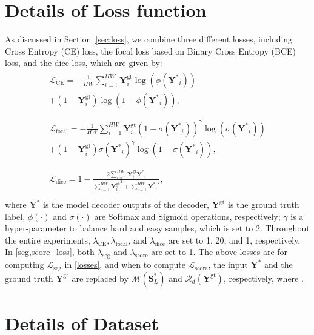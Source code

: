 \documentclass[nohyperref]{article}
\newcommand{\bs}{\boldsymbol}
\newcommand{\asty}{{\mathbf{Y}^*}}
\newcommand{\gty}{\mbf{Y}^{\text{gt}}}
\newcommand{\mbf}{\mathbf}
\theoremstyle{plain}
\theoremstyle{definition}
\theoremstyle{remark}
\begin{document}
\section{Details of Loss function}
\label{appendix:loss}
As discussed in Section~\ref{sec:loss}, we combine three different losses, including Cross Entropy (CE) loss, the focal loss based on Binary Cross Entropy (BCE) loss, and the dice loss, which are given  by:
\begin{align}
\begin{split}
\mathcal{L}_{\text{CE}} = -\frac{1}{HW} \sum^{HW}_{i=1} \gty_i \log(\phi(\asty_i)) \\
    + (1- \gty_i)\log(1-\phi(\asty_i)), \\   
\end{split}\\
\begin{split}
\mathcal{L}_{\text{focal}} = -\frac{1}{HW} \sum^{HW}_{i=1}\gty_i (1- \sigma(\asty_i))^{\gamma} \log(\sigma(\asty_i) )\\
    + (1- \gty_i)\sigma(\asty_i)^{\gamma}\log(1-\sigma(\asty_i)), \\   
\end{split}\\    
\begin{split}
\mathcal{L}_{\text{dice}} = 1 -\frac{2\sum^{HW}_{i=1}\gty_i \asty_i}{\sum^{HW}_{i=1} {\gty_i}^2 + \sum^{HW}_{i=1} {\asty_i}^2}, 
\end{split} \\
\end{align}
where $\asty$ is the model decoder outputs of the decoder, $\gty$ is the ground truth label, $\phi(\cdot)$ and $\sigma(\cdot)$ are Softmax and Sigmoid operations, respectively; $\gamma$ is a hyper-parameter to balance hard and easy samples, which is set to 2.
Throughout the entire experiments,
$\lambda_{\text{CE}}, \lambda_{\text{focal}}$, and $\lambda_{\text{dice}}$ are set to 1, 20, and 1, respectively. In \eqref{seg,score_loss}, both $\lambda_{\text{seg}}$ and  $\lambda_{\text{score}}$ are set to 1. 
The above losses are for computing $\mathcal{L}_{\text{seg}}$ in \eqref{losses}, and when to compute $\mathcal{L}_{\text{score}}$, the input $\asty$ and the ground truth $\gty$ are replaced by $\mathcal{M}(\bs{S}^{\ast}_L)$ and $\mathcal{R}_{d}(\gty)$, respectively, where .



\section{Details of Dataset}
\label{appen_datsset}
\end{document}
